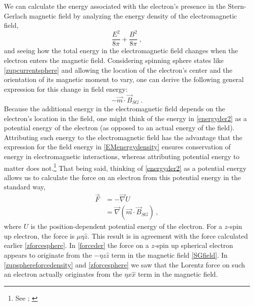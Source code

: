 \documentclass[12pt,secnumarabic,amsmath,amssymb,balancelastpage,nofootinbib]{article}
\begin{document}
We can calculate the energy associated with the electron's presence in the Stern-Gerlach magnetic field by analyzing the energy density of the electromagnetic field,
\begin{equation}
\frac{E^2}{8 \pi} + \frac{B^2}{8 \pi}
\ ,
\label{EMenergydensity}
\end{equation}
and seeing how the total energy in the electromagnetic field changes when the electron enters the magnetic field.  Considering spinning sphere states like \eqref{zupcurrentsphere} and allowing the location of the electron's center and the orientation of its magnetic moment to vary, one can derive the following general expression for this change in field energy:
\begin{equation}
- \vec{m} \cdot \vec{B}_{SG}
\ .
\label{energyder2}
\end{equation}
Because the additional energy in the electromagnetic field depends on the electron's location in the field, one might think of the energy in \eqref{energyder2} as a potential energy of the electron (as opposed to an actual energy of the field).  Attributing such energy to the electromagnetic field has the advantage that the expression for the field energy in \eqref{EMenergydensity} ensures conservation of energy in electromagnetic interactions, whereas attributing potential energy to matter does not.\footnote{See \citet[sec.\ 15.6]{feynman2}; \citet[ch.\ 5]{lange}}  That being said, thinking of \eqref{energyder2} as a potential energy allows us to calculate the force on an electron from this potential energy in the standard way,
\begin{align}
\vec{F}&= - \vec{\nabla} U
\nonumber
\\
&= \vec{\nabla} \left(\vec{m}\cdot\vec{B}_{SG} \right)
\ ,
\label{forceder}
\end{align}
where $U$ is the position-dependent potential energy of the electron.  For a $z$-spin up electron, the force is $\mu \eta \hat{z}$.  This result is in agreement with the force calculated earlier \eqref{zforcesphere}.  In \eqref{forceder} the force on a $z$-spin up spherical electron appears to originate from the $- \eta z\hat{z}$ term in the magnetic field \eqref{SGfield}.  In \eqref{zupsphereforcedensity} and \eqref{zforcesphere} we saw that the Lorentz force on such an electron actually originates from the $\eta x \hat{x}$ term in the magnetic field.
\end{document}

